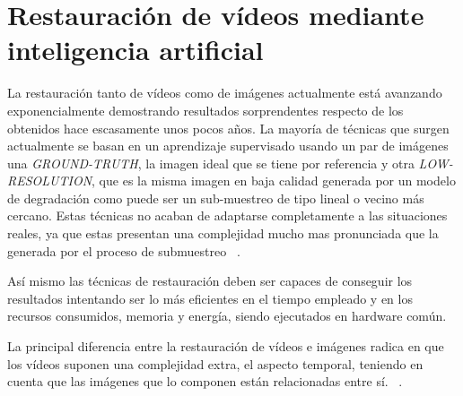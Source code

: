 \section{Restauración de vídeos mediante inteligencia artificial}
 La restauración tanto de vídeos como de imágenes actualmente está avanzando exponencialmente demostrando resultados sorprendentes respecto de los obtenidos hace escasamente unos pocos años. La mayoría de técnicas que surgen actualmente se basan en un aprendizaje supervisado usando un par de imágenes una \emph{GROUND-TRUTH}, la imagen ideal que se tiene por referencia y otra \emph{LOW-RESOLUTION}, que es la misma imagen en baja calidad generada por un modelo de degradación como puede ser un sub-muestreo de tipo lineal o vecino más cercano.
 Estas técnicas no acaban de adaptarse completamente a las situaciones reales, ya que estas presentan una complejidad mucho mas pronunciada que la generada por el proceso de submuestreo ~\cite{9359916}.

 Así mismo las técnicas de restauración deben ser capaces de conseguir los resultados intentando ser lo más eficientes en el tiempo empleado y en los recursos consumidos, memoria y energía, siendo ejecutados en hardware común.
 
 La principal diferencia entre la restauración de vídeos e imágenes radica en que los vídeos suponen una complejidad extra, el aspecto temporal, teniendo en cuenta que las imágenes que lo componen están relacionadas entre sí. ~\cite{8746778}.

